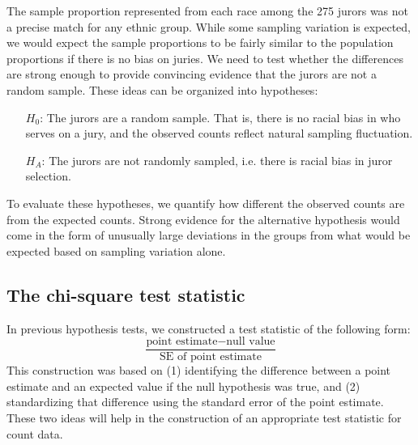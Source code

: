 The sample proportion represented from each race among the 275 jurors was not a precise match for any ethnic group. While some sampling variation is expected, we would expect the sample proportions to be fairly similar to the population proportions if there is no bias on juries. We need to test whether the differences are strong enough to provide convincing evidence that the jurors are not a random sample. These ideas can be organized into hypotheses:
\begin{itemize}
\setlength{\itemsep}{0mm}
\item[$H_0$:] The jurors are a random sample. That is, there is no racial bias in who serves on a jury, and the observed counts reflect natural sampling fluctuation.
\item[$H_A$:] The jurors are not randomly sampled, i.e. there is racial bias in juror selection.
\end{itemize}
To evaluate these hypotheses, we quantify how different the observed counts are from the expected counts. Strong evidence for the alternative hypothesis would come in the form of unusually large deviations in the groups from what would be expected based on sampling variation alone.

\subsection{The chi-square test statistic}
\label{chiSquareTestStatistic}

In previous hypothesis tests, we constructed a test statistic of the following form:
$$ \frac{\text{point estimate} - \text{null value}}{\text{SE of point estimate}} $$
This construction was based on (1) identifying the difference between a point estimate and an expected value if the null hypothesis was true, and (2) standardizing that difference using the standard error of the point estimate. These two ideas will help in the construction of an appropriate test statistic for count data.

